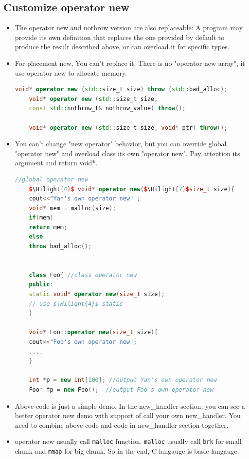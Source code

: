 \documentclass[a4paper,11pt,twoside]{book}
\newcommand{\Hilight}[1]{\makebox[0pt][l]{\color{yellow}\rule[-3pt]{#1em}{11pt}}}
\newcommand{\Hilight}[1]{}
\begin{document}
\subsection{Customize operator new}
\begin{itemize}
	\item The operator new and nothrow version are also replaceable: A program may provide its own definition that replaces the one provided by default to produce the result described above, or can overload it for specific types. 
	\item For placement new, You can't replace it. There is no "operator new array", it use operator new to allocate memory. 
	\begin{lstlisting}[frame=single, language=c++]
	void* operator new (std::size_t size) throw (std::bad_alloc);
	void* operator new (std::size_t size, 
	const std::nothrow_t& nothrow_value) throw();
	
	void* operator new (std::size_t size, void* ptr) throw();
	\end{lstlisting}
	
	\item You can't change "new operator" behavior, but you can override global "operator new" and overload class its own "operator new". Pay attention its argument and return void*. 
	
	\begin{lstlisting}[frame=single, language=c++, mathescape=true]
	//global operator new
	$\Hilight{4}$ void* operator new($\Hilight{7}$size_t size){
	cout<<"Yan's own operator new" ;
	void* mem = malloc(size);
	if(mem)
	return mem;
	else
	throw bad_alloc();
	
	
	class Foo{ //class operator new
	public:
	static void* operator new(size_t size);
	// use $\Hilight{4}$ static
	}
	
	void* Foo::operator new(size_t size){
	cout<<"Foo's own operator new";
	....
	}
	
	int *p = new int[100]; //output Yan's own operator new
	Foo* fp = new Foo();  //output Foo's own operator new
	\end{lstlisting}
	
	\item Above code is just a simple demo, In the new\_handler section, you can see a better operator new demo with support of call your own new\_handler. You need to combine above code and code in new\_handler section together. 
	
	\item operator new usually call \texttt{malloc} function. \texttt{malloc} usually call \texttt{brk} for small chunk and \texttt{mmap} for big chunk. So in the end, C langauge is basic langauge.
	

\end{itemize}
\end{document}
